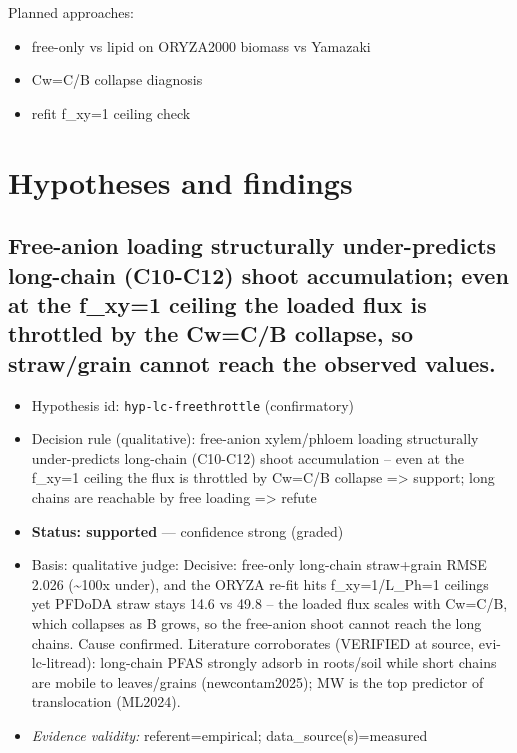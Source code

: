\documentclass{article}
\begin{document}
Planned approaches:
\begin{itemize}
  \item free-only vs lipid on ORYZA2000 biomass vs Yamazaki
  \item Cw=C/B collapse diagnosis
  \item refit f\_xy=1 ceiling check
\end{itemize}

\section{Hypotheses and findings}

\subsection{Free-anion loading structurally under-predicts long-chain (C10-C12) shoot accumulation; even at the f\_xy=1 ceiling the loaded flux is throttled by the Cw=C/B collapse, so straw/grain cannot reach the observed values.}
\begin{itemize}
  \item Hypothesis id: \texttt{hyp-lc-freethrottle} (confirmatory)
  \item Decision rule (qualitative): free-anion xylem/phloem loading structurally under-predicts long-chain (C10-C12) shoot accumulation -- even at the f\_xy=1 ceiling the flux is throttled by Cw=C/B collapse => support; long chains are reachable by free loading => refute
  \item \textbf{Status: supported} --- confidence strong (graded)
  \item Basis: qualitative judge: Decisive: free-only long-chain straw+grain RMSE 2.026 (\textasciitilde{}100x under), and the ORYZA re-fit hits f\_xy=1/L\_Ph=1 ceilings yet PFDoDA straw stays 14.6 vs 49.8 -- the loaded flux scales with Cw=C/B, which collapses as B grows, so the free-anion shoot cannot reach the long chains. Cause confirmed. Literature corroborates (VERIFIED at source, evi-lc-litread): long-chain PFAS strongly adsorb in roots/soil while short chains are mobile to leaves/grains (newcontam2025); MW is the top predictor of translocation (ML2024).
  \item \textit{Evidence validity:} referent=empirical; data\_source(s)=measured
\end{itemize}
\end{document}
